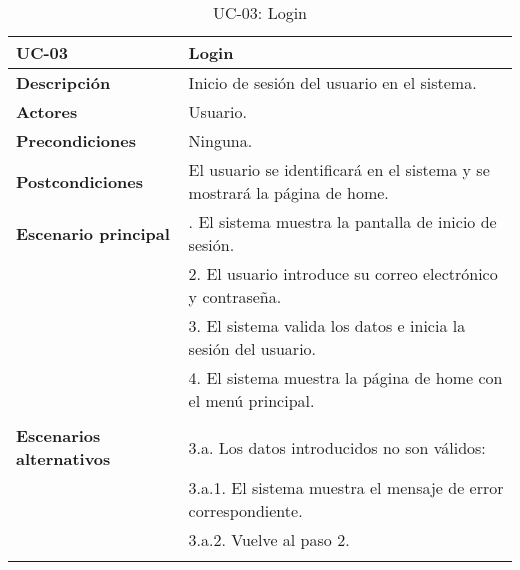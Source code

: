 \begin{table}[H]
  \begin{center}
    \begin{tabularx}{16.4cm}{|l|X|}
      \hline
      \textbf{UC-03} & \textbf{Login}\\
      \hline
      \textbf{Descripción} & Inicio de sesión del usuario en el sistema.\\
      \hline
      \textbf{Actores} & Usuario.\\
      \hline
      \textbf{Precondiciones} & Ninguna.\\
      \hline
      \textbf{Postcondiciones} & El usuario se identificará en el sistema y se mostrará la página de home.\\
      \hline
      \textbf{Escenario principal} & \smallskip 1. El sistema muestra la pantalla de inicio de sesión.\\
      & 2. El usuario introduce su correo electrónico y contraseña.\\
      & 3. El sistema valida los datos e inicia la sesión del usuario.\\
      & 4. El sistema muestra la página de home con el menú principal.\\
      & \\
      \hline
      \textbf{Escenarios alternativos} & \smallskip 3.a. Los datos introducidos no son válidos:\\
      & \hspace{0.3cm} 3.a.1. El sistema muestra el mensaje de error correspondiente.\\
      & \hspace{0.3cm} 3.a.2. Vuelve al paso 2.\\
      & \\
      \hline
    \end{tabularx}
    \caption{UC-03: Login}
  \end{center}
\end{table}


